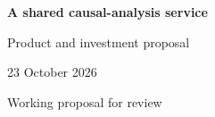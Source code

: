 \documentclass[11pt,a4paper]{article}
\begin{document}
\begin{center}{\LARGE\bfseries A shared causal-analysis service\par}\vspace{3mm}
{\large Product and investment proposal\par}\vspace{2mm}
23 October 2026\par Working proposal for review
\end{center}

\clearpage


\end{document}
